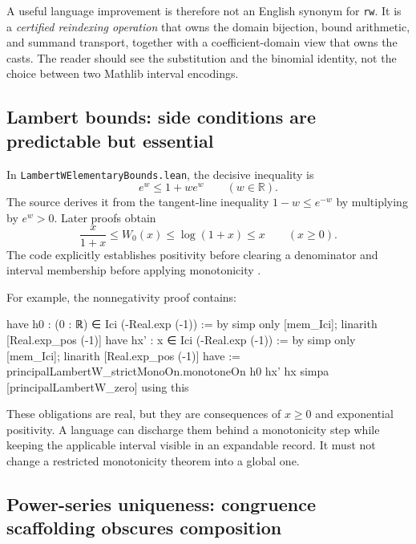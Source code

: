 \documentclass[11pt,a4paper]{article}
\newcommand{\RR}{\mathbb R}
\newcommand{\codeid}[1]{\nolinkurl{#1}}
\begin{document}
A useful language improvement is therefore not an English synonym for \codeid{rw}. It is a \emph{certified reindexing operation} that owns the domain bijection, bound arithmetic, and summand transport, together with a coefficient-domain view that owns the casts. The reader should see the substitution and the binomial identity, not the choice between two Mathlib interval encodings.

\subsection{Lambert bounds: side conditions are predictable but essential}

In \codeid{LambertWElementaryBounds.lean}, the decisive inequality is
\begin{equation}\label{eq:tangent-lambert}
 e^w\leq 1+we^w\qquad(w\in\RR).
\end{equation}
The source derives it from the tangent-line inequality $1-w\leq e^{-w}$ by multiplying by $e^w>0$. Later proofs obtain
\[
 \frac{x}{1+x}\leq W_0(x)\leq \log(1+x)\leq x
 \qquad (x\geq0).
\]
The code explicitly establishes positivity before clearing a denominator and interval membership before applying monotonicity \cite{srclambert}.

For example, the nonnegativity proof contains:
\par\noindent\begin{minipage}{\linewidth}
\begin{rawcode}
have h0 : (0 : ℝ) ∈ Ici (-Real.exp (-1)) := by
  simp only [mem_Ici]; linarith [Real.exp_pos (-1)]
have hx' : x ∈ Ici (-Real.exp (-1)) := by
  simp only [mem_Ici]; linarith [Real.exp_pos (-1)]
have := principalLambertW_strictMonoOn.monotoneOn h0 hx' hx
simpa [principalLambertW_zero] using this
\end{rawcode}
\end{minipage}\par
These obligations are real, but they are consequences of $x\geq0$ and exponential positivity. A language can discharge them behind a monotonicity step while keeping the applicable interval visible in an expandable record. It must not change a restricted monotonicity theorem into a global one.

\subsection{Power-series uniqueness: congruence scaffolding obscures composition}
\end{document}
